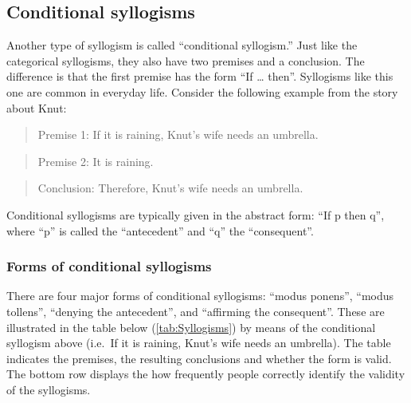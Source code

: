 \documentclass[
]{krantz}
\begin{document}
\hypertarget{conditional-syllogisms}{%
\subsection*{Conditional syllogisms}\label{conditional-syllogisms}}


Another type of syllogism is called ``conditional syllogism.'' Just like the categorical syllogisms, they also have two premises and a conclusion. The difference is that the first premise has the form ``If \ldots{} then''. Syllogisms like this one are common in everyday life. Consider the following example from the story about Knut:

\begin{quote}
Premise 1: If it is raining, Knut's wife needs an umbrella.
\end{quote}

\begin{quote}
Premise 2: It is raining.
\end{quote}

\begin{quote}
Conclusion: Therefore, Knut's wife needs an umbrella.
\end{quote}

Conditional syllogisms are typically given in the abstract form: ``If p then q'', where ``p'' is called the ``antecedent'' and ``q'' the ``consequent''.

\hypertarget{forms-of-conditional-syllogisms}{%
\subsubsection*{Forms of conditional syllogisms}\label{forms-of-conditional-syllogisms}}


There are four major forms of conditional syllogisms: ``modus ponens'', ``modus tollens'', ``denying the antecedent'', and ``affirming the consequent''. These are illustrated in the table below (\ref{tab:Syllogisms}) by means of the conditional syllogism above (i.e.~If it is raining, Knut's wife needs an umbrella). The table indicates the premises, the resulting conclusions and whether the form is valid. The bottom row displays the how frequently people correctly identify the validity of the syllogisms.
\end{document}
